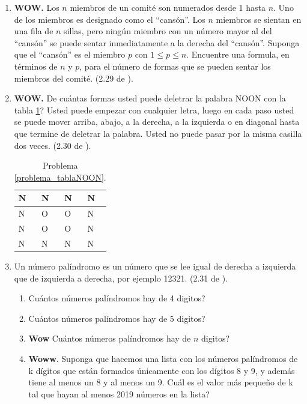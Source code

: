 \begin{enumerate}
	\item \textbf{WOW.} Los $n$ miembros de un comité son numerados desde 1 hasta $n.$ Uno de los miembros es designado como el “cansón”. Los $n$ miembros se sientan en una fila de $n$ sillas, pero ningún miembro con un número mayor al del “cansón” se puede sentar inmediatamente a la derecha del “cansón”. Suponga que el “cansón” es el miembro $p$ con $1\leq p\leq n$. Encuentre una formula, en términos de $n$ y $p$, para el número de formas que se pueden sentar los miembros del comité. (2.29 de \cite{ICP_Aops}).
	
	\item \label{problema_tablaNOON} \textbf{WOW.} De cuántas formas usted puede deletrar la palabra NOON con la tabla \ref{tabla_NOON}? Usted puede empezar con cualquier letra, luego en cada paso usted se puede mover arriba, abajo, a la derecha, a la izquierda o en diagonal hasta que termine de deletrar la palabra. Usted no puede pasar por la misma casilla dos veces. (2.30 de \cite{ICP_Aops}).
	
	\begin{table}[]
		\centering
		\begin{tabular}{|l|l|l|l|}
			\hline
			N & N & N & N \\ \hline
			N & O & O & N \\ \hline
			N & O & O & N \\ \hline
			N & N & N & N \\ \hline
		\end{tabular}
		\caption{Problema \ref{problema_tablaNOON}.}
		\label{tabla_NOON}
	\end{table}
	
	\item Un número palíndromo es un número que se lee igual de derecha a izquierda que de izquierda a derecha, por ejemplo 12321. (2.31 de \cite{ICP_Aops}).
	\begin{enumerate}
		\item Cuántos números palíndromos hay de 4 digitos?
		\item Cuántos números palíndromos hay de 5 digitos?
		\item \textbf{Wow} Cuántos números palíndromos hay de $n$ digitos?
		\item \textbf{Woww}. Suponga que hacemos una lista con los números palíndromos de k dígitos que están formados únicamente con los dígitos 8 y 9, y además tiene al menos un 8 y al menos un 9. Cuál es el valor más pequeño de k tal que hayan al menos 2019 números en la lista? 
	\end{enumerate}
	

\end{enumerate}
